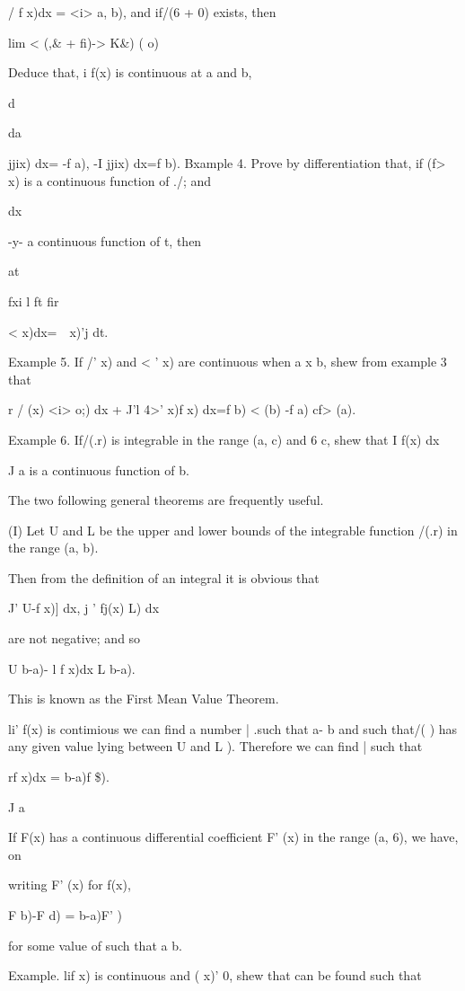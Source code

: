 / f x)dx = <i> a, b), and if/(6 + 0) exists, then

lim < (,\& + fi)-> K\&) ( o)

Deduce that, i f(x) is continuous at a and b,

d\

da

jjix) dx= -f a), -I jjix) dx=f b). Bxample 4. Prove by differentiation
that, if (f> x) is a continuous function of ./; and

dx

-y- a continuous function of t, then

at

fxi l ft fir

 < x)dx=\ \ x)'j dt.

Example 5. If /' x) and < ' x) are continuous when a x b, shew from
example 3 that

r / (x) <i> o;) dx + J'l 4>' x)f x) dx=f b) < (b) -f a) cf> (a).

Example 6. If/(.r) is integrable in the range (a, c) and 6 c, shew
that I f(x) dx

J a is a continuous function of b.


The two following general theorems are frequently useful.

(I) Let U and L be the upper and lower bounds of the integrable
function /(.r) in the range (a, b).

Then from the definition of an integral it is obvious that

J' U-f x)] dx, j ' fj(x) L) dx

are not negative; and so

U b-a)- l f x)dx L b-a).

This is known as the First Mean Value Theorem.

li' f(x) is contimious we can find a number | .such that a- b and such
that/( ) has any given value lying between U and L ). Therefore
we can find | such that

rf x)dx = b-a)f \$).

J a

If F(x) has a continuous differential coefficient F' (x) in the range
(a, 6), we have, on

writing F' (x) for f(x),

F b)-F d) = b-a)F' )

for some value of such that a b.

Example. lif x) is continuous and ( x)' 0, shew that can be found such
that

